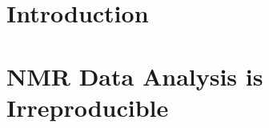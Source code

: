 \documentclass[11pt,a4paper]{report}
\begin{document}








\tableofcontents

\listoftables

\listoffigures

\chapter{Introduction}



\chapter{NMR Data Analysis is Irreproducible}




%


\end{document}
